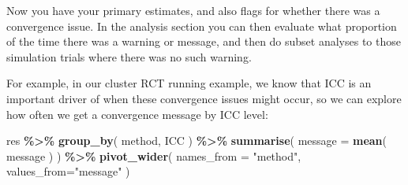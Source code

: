 \documentclass[
]{book}
\newenvironment{Shaded}{\begin{snugshade}}{\end{snugshade}}
\newcommand{\AttributeTok}[1]{\textcolor[rgb]{0.13,0.29,0.53}{#1}}
\newcommand{\CommentTok}[1]{\textcolor[rgb]{0.56,0.35,0.01}{\textit{#1}}}
\newcommand{\ControlFlowTok}[1]{\textcolor[rgb]{0.13,0.29,0.53}{\textbf{#1}}}
\newcommand{\DecValTok}[1]{\textcolor[rgb]{0.00,0.00,0.81}{#1}}
\newcommand{\FunctionTok}[1]{\textcolor[rgb]{0.13,0.29,0.53}{\textbf{#1}}}
\newcommand{\NormalTok}[1]{#1}
\newcommand{\OtherTok}[1]{\textcolor[rgb]{0.56,0.35,0.01}{#1}}
\newcommand{\SpecialCharTok}[1]{\textcolor[rgb]{0.81,0.36,0.00}{\textbf{#1}}}
\newcommand{\StringTok}[1]{\textcolor[rgb]{0.31,0.60,0.02}{#1}}
\begin{document}
\begin{Shaded}
\end{Shaded}

Now you have your primary estimates, and also flags for whether there was a convergence issue.
In the analysis section you can then evaluate what proportion of the time there was a warning or message, and then do subset analyses to those simulation trials where there was no such warning.

For example, in our cluster RCT running example, we know that ICC is an important driver of when these convergence issues might occur, so we can explore how often we get a convergence message by ICC level:

\begin{Shaded}
\begin{Highlighting}[]
\NormalTok{res }\SpecialCharTok{\%\textgreater{}\%} 
  \FunctionTok{group\_by}\NormalTok{( method, ICC ) }\SpecialCharTok{\%\textgreater{}\%}
  \FunctionTok{summarise}\NormalTok{( }\AttributeTok{message =} \FunctionTok{mean}\NormalTok{( message ) ) }\SpecialCharTok{\%\textgreater{}\%}
  \FunctionTok{pivot\_wider}\NormalTok{( }\AttributeTok{names\_from =} \StringTok{"method"}\NormalTok{, }\AttributeTok{values\_from=}\StringTok{"message"}\NormalTok{ )}
\end{Highlighting}
\end{Shaded}
\end{document}

